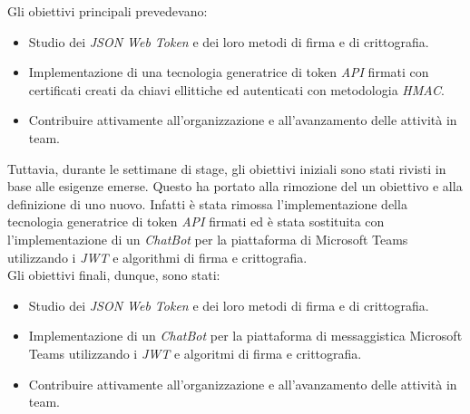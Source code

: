 \noindent Gli obiettivi principali prevedevano:
\begin{itemize}
	\item Studio dei \emph{JSON Web Token} e dei loro metodi di firma e di crittografia.
	\item Implementazione di una tecnologia generatrice di token \emph{API} firmati con certificati creati da chiavi ellittiche ed autenticati con metodologia \emph{HMAC}.
	\item Contribuire attivamente all'organizzazione e all'avanzamento delle attività in team.
\end{itemize}

Tuttavia, durante le settimane di stage, gli obiettivi iniziali sono stati rivisti in base alle esigenze emerse. Questo ha portato alla rimozione del un obiettivo e alla definizione di uno nuovo.
Infatti è stata rimossa l'implementazione della tecnologia generatrice di token \emph{API} firmati ed è stata sostituita con l'implementazione di un \emph{ChatBot} per la piattaforma di Microsoft Teams utilizzando i \emph{JWT} e algorithmi di firma e crittografia. \\

\noindent Gli obiettivi finali, dunque, sono stati:
\begin{itemize}
	\item Studio dei \emph{JSON Web Token} e dei loro metodi di firma e di crittografia.
	\item Implementazione di un \emph{ChatBot} per la piattaforma di messaggistica Microsoft Teams utilizzando i \emph{JWT} e algoritmi di firma e crittografia.
	\item Contribuire attivamente all'organizzazione e all'avanzamento delle attività in team.
\end{itemize}
